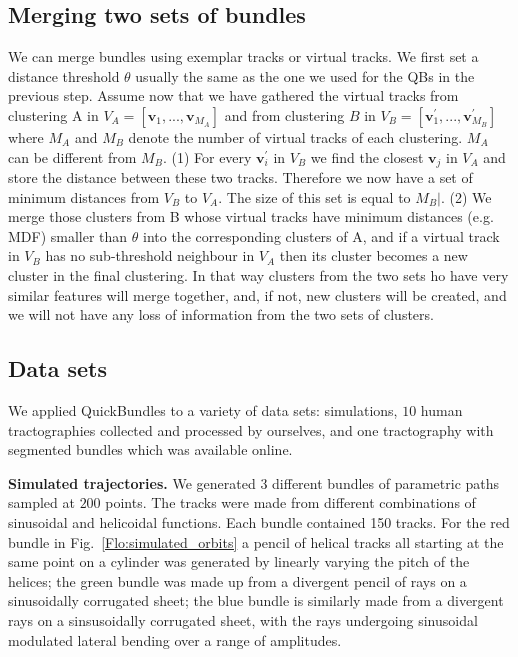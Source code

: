 \documentclass{bioinfo}
\begin{document}
\begin{methods}
\subsection{Merging two sets of bundles\label{sub:merging}}

We can merge bundles using exemplar tracks or virtual tracks. We first
set a distance threshold $\theta$ usually the same as the one we used
for the QBs in the previous step. Assume now that we have gathered the
virtual tracks from clustering A in $V_{A}=[\mathbf{v}_{1},...,\mathbf{v}_{M_{A}}]$
and from clustering $B$ in $V_{B}=[\mathbf{v}_{1}^{'},...,\mathbf{v}_{M_{B}}^{'}]$
where $M_A$ and $M_B$ denote the number of virtual tracks of each clustering.
$M_{A}$ can be different from $M_{B}$. (1) For every $\mathbf{v}_{i}^{'}$ in
$V_{B}$ we find the closest $\mathbf{v}_{j}$ in $V_{A}$ and store the
distance between these two tracks. Therefore we now have a set of
minimum distances from $V_{B}$ to $V_{A}$. The size of this set is equal
to $M_{B}|$. (2) We merge those clusters from B whose virtual
tracks have minimum distances (e.g. MDF) smaller than $\theta$ into the
corresponding clusters of A, and if a virtual track in $V_{B}$ has no
sub-threshold neighbour in $V_{A}$ then its cluster becomes a new
cluster in the final clustering. In that way clusters from the two sets
ho have very similar features will merge together, and, if not, new
clusters will be created, and we will not have any loss of information
from the two sets of clusters.

\subsection{\label{sub:QB-Data-sets}Data sets}

We applied QuickBundles to a variety of data sets: simulations, $10$ human
tractographies collected and processed by ourselves, and one tractography
with segmented bundles which was available online.

\textbf{Simulated trajectories.} We generated $3$ different bundles of
parametric paths sampled at $200$ points. The tracks were made from
different combinations of sinusoidal and helicoidal functions.  Each
bundle contained 150 tracks.  For the red bundle in
Fig.~\ref{Flo:simulated_orbits} a pencil of helical tracks all starting
at the same point on a cylinder was generated by linearly varying the
pitch of the helices; the green bundle was made up from a divergent
pencil of rays on a sinusoidally corrugated sheet; the blue bundle is
similarly made from a divergent rays on a sinsusoidally corrugated
sheet, with the rays undergoing sinusoidal modulated lateral bending
over a range of amplitudes.


\end{methods}
\end{document}
